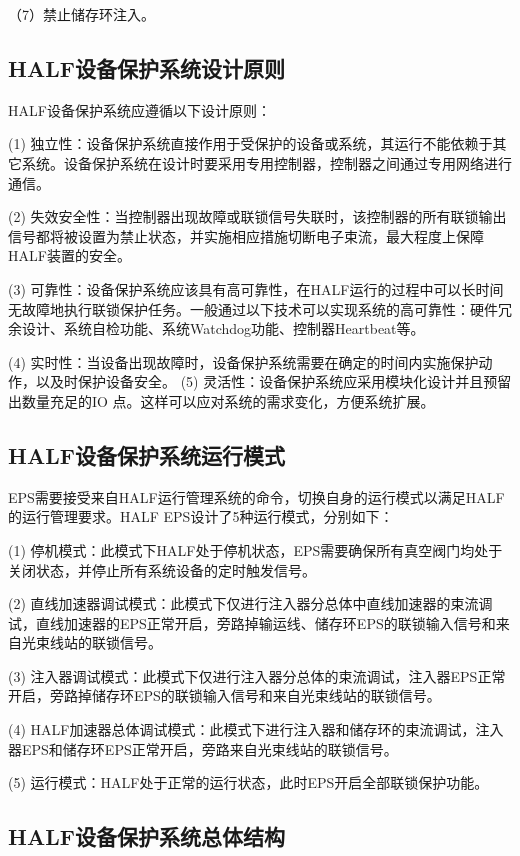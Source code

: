 （7）禁止储存环注入。


\subsection{HALF设备保护系统设计原则}

HALF设备保护系统应遵循以下设计原则：

(1) 独立性：设备保护系统直接作用于受保护的设备或系统，其运行不能依赖于其它系统。设备保护系统在设计时要采用专用控制器，控制器之间通过专用网络进行通信。

(2) 失效安全性：当控制器出现故障或联锁信号失联时，该控制器的所有联锁输出信号都将被设置为禁止状态，并实施相应措施切断电子束流，最大程度上保障HALF装置的安全。

(3) 可靠性：设备保护系统应该具有高可靠性，在HALF运行的过程中可以长时间无故障地执行联锁保护任务。一般通过以下技术可以实现系统的高可靠性：硬件冗余设计、系统自检功能、系统Watchdog功能、控制器Heartbeat等。

(4) 实时性：当设备出现故障时，设备保护系统需要在确定的时间内实施保护动作，以及时保护设备安全。
(5) 灵活性：设备保护系统应采用模块化设计并且预留出数量充足的IO 点。这样可以应对系统的需求变化，方便系统扩展。

\subsection{HALF设备保护系统运行模式}

EPS需要接受来自HALF运行管理系统的命令，切换自身的运行模式以满足HALF的运行管理要求。HALF EPS设计了5种运行模式，分别如下：

(1) 停机模式：此模式下HALF处于停机状态，EPS需要确保所有真空阀门均处于关闭状态，并停止所有系统设备的定时触发信号。

(2) 直线加速器调试模式：此模式下仅进行注入器分总体中直线加速器的束流调试，直线加速器的EPS正常开启，旁路掉输运线、储存环EPS的联锁输入信号和来自光束线站的联锁信号。

(3) 注入器调试模式：此模式下仅进行注入器分总体的束流调试，注入器EPS正常开启，旁路掉储存环EPS的联锁输入信号和来自光束线站的联锁信号。

(4) HALF加速器总体调试模式：此模式下进行注入器和储存环的束流调试，注入器EPS和储存环EPS正常开启，旁路来自光束线站的联锁信号。

(5) 运行模式：HALF处于正常的运行状态，此时EPS开启全部联锁保护功能。

\subsection{HALF设备保护系统总体结构}

